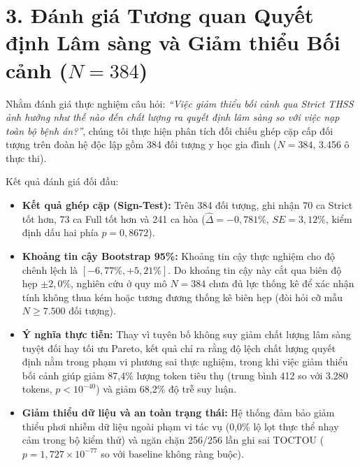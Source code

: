\documentclass[11pt]{article}
\begin{document}
\section*{3. Đánh giá Tương quan Quyết định Lâm sàng và Giảm thiểu Bối cảnh ($N=384$)}
Nhằm đánh giá thực nghiệm câu hỏi: \emph{``Việc giảm thiểu bối cảnh qua Strict THSS ảnh hưởng như thế nào đến chất lượng ra quyết định lâm sàng so với việc nạp toàn bộ bệnh án?''}, chúng tôi thực hiện phân tích đối chiếu ghép cặp cấp đối tượng trên đoàn hệ độc lập gồm 384 đối tượng y học gia đình ($N=384$, 3.456 ô thực thi).

Kết quả đánh giá đối đầu:
\begin{itemize}[leftmargin=1.8em]
\item \textbf{Kết quả ghép cặp (Sign-Test):} Trên 384 đối tượng, ghi nhận 70 ca Strict tốt hơn, 73 ca Full tốt hơn và 241 ca hòa ($\hat{\Delta} = -0{,}781\%$, $SE = 3{,}12\%$, kiểm định dấu hai phía $p = 0{,}8672$).
\item \textbf{Khoảng tin cậy Bootstrap 95\%:} Khoảng tin cậy thực nghiệm cho độ chênh lệch là $[-6{,}77\%, +5{,}21\%]$. Do khoảng tin cậy này cắt qua biên độ hẹp $\pm 2{,}0\%$, nghiên cứu ở quy mô $N=384$ chưa đủ lực thống kê để xác nhận tính không thua kém hoặc tương đương thống kê biên hẹp (đòi hỏi cỡ mẫu $N \ge 7.500$ đối tượng).
\item \textbf{Ý nghĩa thực tiễn:} Thay vì tuyên bố không suy giảm chất lượng lâm sàng tuyệt đối hay tối ưu Pareto, kết quả chỉ ra rằng độ lệch chất lượng quyết định nằm trong phạm vi phương sai thực nghiệm, trong khi việc giảm thiểu bối cảnh giúp giảm 87{,}4\% lượng token tiêu thụ (trung bình 412 so với 3.280 tokens, $p < 10^{-40}$) và giảm 68{,}2\% độ trễ suy luận.
\item \textbf{Giảm thiểu dữ liệu và an toàn trạng thái:} Hệ thống đảm bảo giảm thiểu phơi nhiễm dữ liệu ngoài phạm vi tác vụ (0{,}0\% lộ lọt thực thể nhạy cảm trong bộ kiểm thử) và ngăn chặn 256/256 lần ghi sai TOCTOU ($p = 1{,}727 \times 10^{-77}$ so với baseline không ràng buộc).
\end{itemize}
\end{document}
